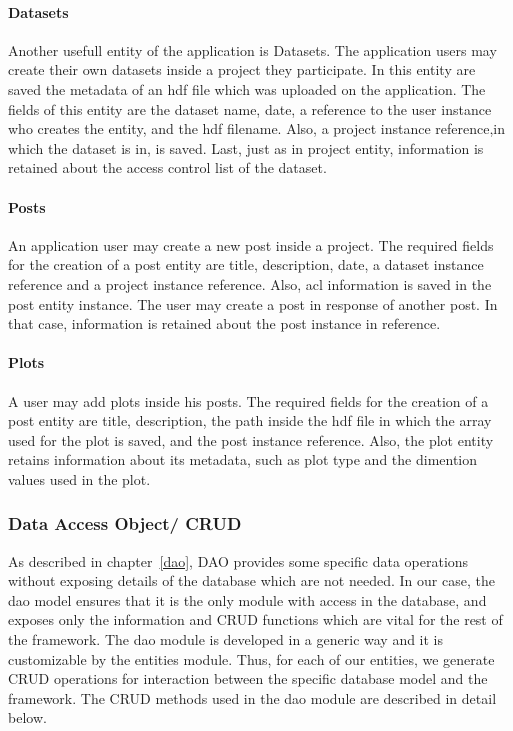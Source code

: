 \paragraph{Datasets}
Another usefull entity of the application is Datasets. The application users may create their own datasets inside a project they participate. In this entity are saved the metadata of an hdf file which was uploaded on the application. The fields of this entity are the dataset name, date, a reference to the user instance who creates the entity, and the hdf filename. Also, a project instance reference,in which the dataset is in, is saved. Last, just as in project entity, information is retained about the access control list of the dataset.
\paragraph{Posts}
An application user may create a new post inside a project. The required fields for the creation of a post entity are title, description, date, a dataset instance reference and a project instance reference. Also, acl information  is saved in the post entity instance. The user may create a post in response of another post. In that case, information is retained about the post instance in reference.
\paragraph{Plots}
A user may add plots inside his posts. The required fields for the creation of a post entity are title, description, the path inside the hdf file in which the array used for the plot is saved, and the post instance reference. Also, the plot entity retains information about its metadata, such as plot type and the dimention values used in the plot.

\subsubsection{Data Access Object/ CRUD}
\label{daocrud}
As described in chapter~\ref{dao}, DAO provides some specific data operations without exposing details of the database which are not needed. In our case, the dao model ensures that it is the only module with access in the database, and exposes only the information and CRUD functions which are vital for the rest of the framework. The dao module is developed in a generic way and it is customizable by the entities module. Thus, for each of our entities, we generate CRUD operations for interaction between the specific database model and the framework. The CRUD methods used in the dao module are described in detail below.

